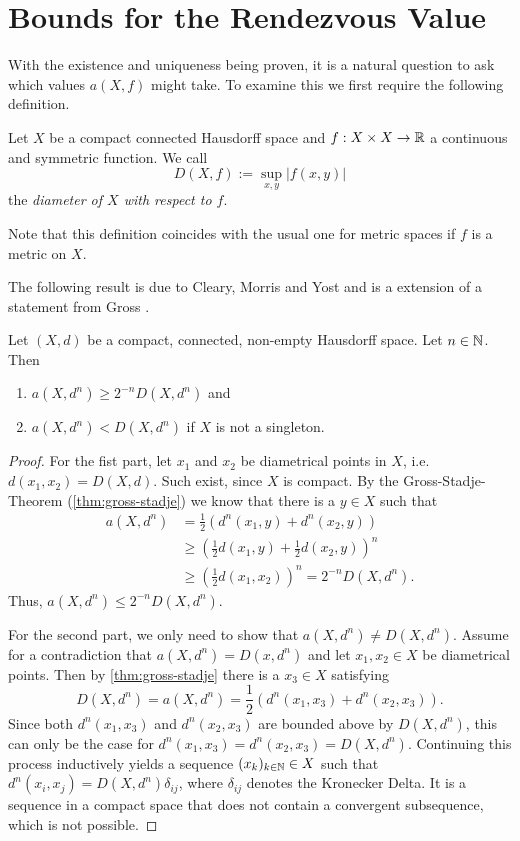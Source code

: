 \section{Bounds for the Rendezvous Value}
With the existence and uniqueness being proven, it is a natural question to ask  which values $a(X,f)$ might take. To examine this we first require the following definition.

\begin{definition}
	Let $X$ be a compact connected Hausdorff space and $f: X\times X\to \mathbb{R}$ a continuous and symmetric function. We call 
	\[
	D(X,f):=\sup_{x,y}|f(x,y)|
	\]
	the \emph{diameter of $X$ with respect to $f$}.
\end{definition}
Note that this definition coincides with the usual one for metric spaces if $f$ is a metric on $X$.

The following result is due to Cleary, Morris and Yost \cite{cleary:numbers-of-shapes} and is a extension of a statement from Gross \cite{gross}.
\begin{theorem}\label{thm:metric-bounds}
	Let $(X,d)$ be a compact, connected, non-empty Hausdorff space. Let $n\in \mathbb{N}$. Then
	\begin{enumerate}
		\item $a(X,d^n)\geq 2^{-n}D(X,d^n)$ and 
		\item $a(X,d^n)< D(X,d^n)$ if $X$ is not a singleton.
	\end{enumerate}
\end{theorem}

\begin{proof}
	For the fist part, let $x_1$ and $x_2$ be diametrical points in $X$, i.e. $d(x_1,x_2)=D(X,d)$. Such exist, since $X$ is compact. By the Gross-Stadje-Theorem (\autoref{thm:gross-stadje}) we know that there is a $y\in X$ such that
	\begin{align*}
	a(X,d^n)&=\frac{1}{2}\left(d^n(x_1,y)+d^n(x_2,y)\right)\\
	&\geq\left(\frac{1}{2}d(x_1,y)+\frac{1}{2}d(x_2,y)\right)^n\\
	&\geq\left(\frac{1}{2}d(x_1,x_2)\right)^n=2^{-n}D(X,d^n).
	\end{align*}
	Thus, $a(X,d^n)\leq 2^{-n}D(X,d^n)$.
	
	For the second part, we only need to show that $a(X,d^n)\neq D(X,d^n)$. Assume for a contradiction that $a(X,d^n)=D(x,d^n)$ and let $x_1, x_2\in X$ be diametrical points. Then by \autoref{thm:gross-stadje} there is a $x_3\in X$ satisfying
	\[
	D(X,d^n)=a(X,d^n)=\frac{1}{2}\left(d^n(x_1,x_3)+d^n(x_2,x_3)\right).
	\]
	Since both $d^n(x_1,x_3)$ and $d^n(x_2,x_3)$ are bounded above by $D(X,d^n)$, this can only be the case for $d^n(x_1,x_3)=d^n(x_2,x_3)=D(X,d^n)$. Continuing this process inductively yields a sequence $(x_k)_{k\in \mathbb{N}}\in X$ such that $d^n(x_i,x_j)=D(X,d^n)\delta_{ij}$, where $\delta_{ij}$ denotes the Kronecker Delta. It is a sequence in a compact space that does not contain a convergent subsequence, which is not possible.
\end{proof}

